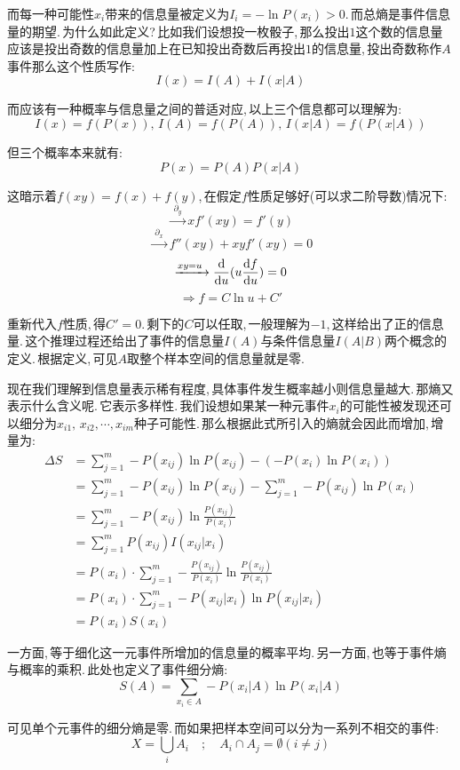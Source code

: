 而每一种可能性\(x_i\)带来的信息量被定义为\(I_i=-\ln P(x_i)>0\).\,而总熵是事件信息量的期望.\,为什么如此定义?\,比如我们设想投一枚骰子,\,那么投出\(1\)这个数的信息量应该是投出奇数的信息量加上在已知投出奇数后再投出\(1\)的信息量,\,投出奇数称作\(A\)事件那么这个性质写作:
\[I(x)=I(A)+I(x|A)\]

而应该有一种概率与信息量之间的普适对应,\,以上三个信息都可以理解为:
\[I(x)=f(P(x)),\,I(A)=f(P(A)),\,I(x|A)=f(P(x|A))\]

但三个概率本来就有:
\[P(x)=P(A)P(x|A)\]

这暗示着\(f(xy)=f(x)+f(y)\),\,在假定\(f\)性质足够好(可以求二阶导数)情况下:
\[\xrightarrow{\;\partial_y\;} xf'(xy)=f'(y)\]
\[\xrightarrow{\;\partial_x\;} f''(xy)+xyf'(xy)=0\]
\[\xrightarrow{xy=u\;} \frac{\textrm{d}}{\textrm{d} u}(u\frac{\textrm{d} f}{\textrm{d} u})=0\]
\[\Rightarrow f=C\ln u+C'\]

重新代入\(f\)性质,\,得\(C'=0\).\,剩下的\(C\)可以任取,\,一般理解为\(-1\),\,这样给出了正的信息量.\,这个推理过程还给出了事件的信息量\(I(A)\)与条件信息量\(I(A|B)\)两个概念的定义.\,根据定义,\,可见\(A\)取整个样本空间的信息量就是零.

现在我们理解到信息量表示稀有程度,\,具体事件发生概率越小则信息量越大.\,那熵又表示什么含义呢.\,它表示多样性.\,我们设想如果某一种元事件\(x_i\)的可能性被发现还可以细分为\(x_{i1},\,x_{i2},\cdots,x_{im}\)种子可能性.\,那么根据此式所引入的熵就会因此而增加,\,增量为:
\begin{align*}
\Delta S & = \sum_{j=1}^m -P(x_{ij})\ln P(x_{ij})-(-P(x_i)\ln P(x_i))\\
		 & = \sum_{j=1}^m -P(x_{ij})\ln P(x_{ij})-\sum_{j=1}^m -P(x_{ij})\ln P(x_i)\\
		 & = \sum_{j=1}^m -P(x_{ij})\ln\frac{P(x_{ij})}{P(x_i)}\\
		 & = \sum_{j=1}^m P(x_{ij})I(x_{ij}|x_i)\\
		 & = P(x_i)\cdot \sum_{j=1}^m -\frac{P(x_{ij})}{P(x_i)}\ln\frac{P(x_{ij})}{P(x_i)}\\
		 & = P(x_i)\cdot \sum_{j=1}^m -P(x_{ij}|x_i)\ln P(x_{ij}|x_i)\\
		 & = P(x_i) S(x_i)
\end{align*}

一方面,\,等于细化这一元事件所增加的信息量的概率平均.\,另一方面,\,也等于事件熵与概率的乘积.\,此处也定义了事件细分熵:
\[S(A)=\sum_{x_i\in A}-P(x_i|A)\ln P(x_i|A)\]

可见单个元事件的细分熵是零.\,而如果把样本空间可以分为一系列不相交的事件:
\[X=\bigcup_i A_i\quad ;\quad A_i\cap A_j=\emptyset(i\neq j)\]


